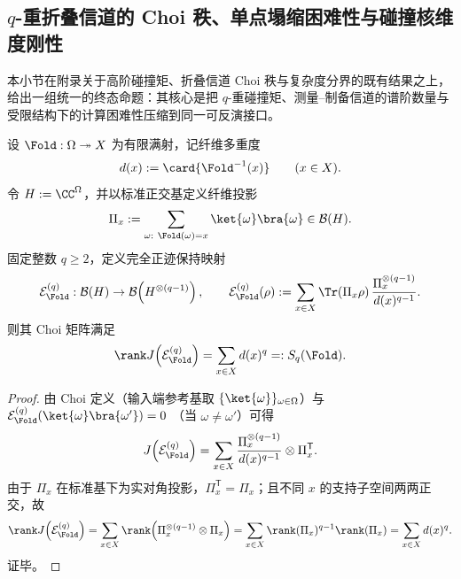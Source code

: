\subsection{\texorpdfstring{$q$}{q}-重折叠信道的 Choi 秩、单点塌缩困难性与碰撞核维度刚性}\label{subsec:conclusion-qcollision-choi-rank-sharpp-kernel-dimension-pdet}
本小节在附录关于高阶碰撞矩、折叠信道 Choi 秩与复杂度分界的既有结果之上，给出一组统一的终态命题：其核心是把 \(q\)-重碰撞矩、测量--制备信道的谱阶数量与受限结构下的计算困难性压缩到同一可反演接口。

\begin{theorem}\label{thm:conclusion-qfold-channel-choi-rank-equals-qcollision}
设 \(\Fold:\Omega\twoheadrightarrow X\) 为有限满射，记纤维多重度
\[
d(x):=\card{\Fold^{-1}(x)}\qquad(x\in X).
\]
令 \(H:=\CC^\Omega\)，并以标准正交基定义纤维投影
\[
\Pi_x:=\sum_{\omega:\ \Fold(\omega)=x}\ket{\omega}\bra{\omega}\in\mathcal B(H).
\]
固定整数 \(q\ge 2\)，定义完全正迹保持映射
\[
\mathcal E_{\Fold}^{(q)}:\mathcal B(H)\to\mathcal B\!\left(H^{\otimes(q-1)}\right),\qquad
\mathcal E_{\Fold}^{(q)}(\rho):=\sum_{x\in X}\Tr(\Pi_x\rho)\,\frac{\Pi_x^{\otimes(q-1)}}{d(x)^{q-1}}.
\]
则其 Choi 矩阵满足
\[
\rank J\!\left(\mathcal E_{\Fold}^{(q)}\right)=\sum_{x\in X}d(x)^q=:S_q(\Fold).
\]
\end{theorem}
\begin{proof}
由 Choi 定义（输入端参考基取 \(\{\ket{\omega}\}_{\omega\in\Omega}\)）与
\(
\mathcal E_{\Fold}^{(q)}(\ket{\omega}\bra{\omega'})
=0
\)
（当 \(\omega\neq\omega'\)）可得
\[
J\!\left(\mathcal E_{\Fold}^{(q)}\right)
=
\sum_{x\in X}\frac{\Pi_x^{\otimes(q-1)}}{d(x)^{q-1}}\otimes \Pi_x^{\mathsf T}.
\]
由于 \(\Pi_x\) 在标准基下为实对角投影，\(\Pi_x^{\mathsf T}=\Pi_x\)；且不同 \(x\) 的支持子空间两两正交，故
\[
\rank J\!\left(\mathcal E_{\Fold}^{(q)}\right)
=\sum_{x\in X}\rank\!\left(\Pi_x^{\otimes(q-1)}\otimes\Pi_x\right)
=\sum_{x\in X}\rank(\Pi_x)^{q-1}\rank(\Pi_x)
=\sum_{x\in X}d(x)^q.
\]
证毕。
\end{proof}

